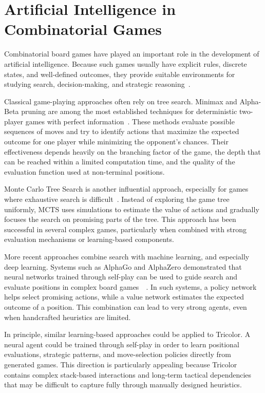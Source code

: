 \section{Artificial Intelligence in Combinatorial Games}

Combinatorial board games have played an important role in the development of artificial intelligence. Because such games usually have explicit rules, discrete states, and well-defined outcomes, they provide suitable environments for studying search, decision-making, and strategic reasoning~\cite{russell2010aima}.

Classical game-playing approaches often rely on tree search. Minimax and Alpha-Beta pruning are among the most established techniques for deterministic two-player games with perfect information~\cite{russell2010aima}. These methods evaluate possible sequences of moves and try to identify actions that maximize the expected outcome for one player while minimizing the opponent’s chances. Their effectiveness depends heavily on the branching factor of the game, the depth that can be reached within a limited computation time, and the quality of the evaluation function used at non-terminal positions.

Monte Carlo Tree Search is another influential approach, especially for games where exhaustive search is difficult~\cite{browne2012mcts}. Instead of exploring the game tree uniformly, MCTS uses simulations to estimate the value of actions and gradually focuses the search on promising parts of the tree. This approach has been successful in several complex games, particularly when combined with strong evaluation mechanisms or learning-based components.

More recent approaches combine search with machine learning, and especially deep learning. Systems such as AlphaGo and AlphaZero demonstrated that neural networks trained through self-play can be used to guide search and evaluate positions in complex board games~\cite{silver2016go}~\cite{silver2018alphazero}. In such systems, a policy network helps select promising actions, while a value network estimates the expected outcome of a position. This combination can lead to very strong agents, even when handcrafted heuristics are limited.

In principle, similar learning-based approaches could be applied to Tricolor. A neural agent could be trained through self-play in order to learn positional evaluations, strategic patterns, and move-selection policies directly from generated games. This direction is particularly appealing because Tricolor contains complex stack-based interactions and long-term tactical dependencies that may be difficult to capture fully through manually designed heuristics.

